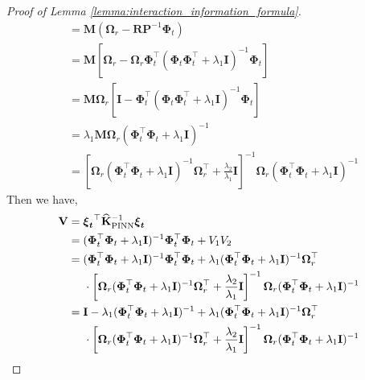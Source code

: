 \begin{proof}[Proof of Lemma \ref{lemma:interaction_information_formula}]
\begin{align}
            & = \mathbf{M}(\boldsymbol{\Omega}_r - \mathbf{R}\mathbf{P}^{-1}\boldsymbol{\Phi}_t)\\
            & = \mathbf{M}\left[\boldsymbol{\Omega}_r - \boldsymbol{\Omega}_r \boldsymbol{\Phi}_t^\top (\boldsymbol{\Phi}_t \boldsymbol{\Phi}_t^\top + \lambda_1\mathbf{I})^{-1}\boldsymbol{\Phi}_t\right] \\
            & = \mathbf{M}\boldsymbol{\Omega}_r \left[ \mathbf{I} - \boldsymbol{\Phi}_t^\top (\boldsymbol{\Phi}_t \boldsymbol{\Phi}_t^\top + \lambda_1\mathbf{I})^{-1}\boldsymbol{\Phi}_t\right]\\
            & = \lambda_1 \mathbf{M} \boldsymbol{\Omega}_r (\boldsymbol{\Phi}_t^\top \boldsymbol{\Phi}_t + \lambda_1\mathbf{I})^{-1} \\ 
            & = \left[\boldsymbol{\Omega}_r(\boldsymbol{\Phi}_t^\top \boldsymbol{\Phi}_t+ \lambda_1\mathbf{I})^{-1}\boldsymbol{\Omega}_r^\top + \frac{\lambda_2} {\lambda_1} \mathbf{I}\right]^{-1} \boldsymbol{\Omega}_r (\boldsymbol{\Phi}_t^\top \boldsymbol{\Phi}_t + \lambda_1\mathbf{I})^{-1}
    \end{align}
    Then we have, 
    \begin{align}
            \mathbf{V} &= \boldsymbol{\boldsymbol{\xi}_t}^\top \mathbf{\widehat{K}}_\mathrm{PINN}^{-1} \boldsymbol{\boldsymbol{\xi}_t}  
            \\
            & = (\boldsymbol{\Phi}_t^\top\boldsymbol{\Phi}_t+\lambda_1 \mathbf{I})^{-1} \boldsymbol{\Phi}_t^\top\boldsymbol{\Phi}_t + V_1V_2
            \\
            & = (\boldsymbol{\Phi}_t^\top\boldsymbol{\Phi}_t+\lambda_1 \mathbf{I})^{-1} \boldsymbol{\Phi}_t^\top\boldsymbol{\Phi}_t + \lambda_1(\boldsymbol{\Phi}_t^\top\boldsymbol{\Phi}_t + \lambda_1\mathbf{I})^{-1} \boldsymbol{\Omega}_r^\top \notag \\
            &  \;\;\;\;\; \cdot \left[\boldsymbol{\Omega}_r(\boldsymbol{\Phi}_t^\top \boldsymbol{\Phi}_t+ \lambda_1\mathbf{I})^{-1}\boldsymbol{\Omega}_r^\top + \frac{\lambda_2} {\lambda_1} \mathbf{I}\right]^{-1} \boldsymbol{\Omega}_r (\boldsymbol{\Phi}_t^\top \boldsymbol{\Phi}_t + \lambda_1\mathbf{I})^{-1} 
            \\
            &= \mathbf{I} - \lambda_1(\boldsymbol{\Phi}_t^\top\boldsymbol{\Phi}_t+\lambda_1 \mathbf{I})^{-1} + \lambda_1(\boldsymbol{\Phi}_t^\top\boldsymbol{\Phi}_t + \lambda_1\mathbf{I})^{-1} \boldsymbol{\Omega}_r^\top \notag \\
            & \;\;\;\;\;   \cdot \left[\boldsymbol{\Omega}_r(\boldsymbol{\Phi}_t^\top \boldsymbol{\Phi}_t+ \lambda_1\mathbf{I})^{-1}\boldsymbol{\Omega}_r^\top + \frac{\lambda_2} {\lambda_1} \mathbf{I}\right]^{-1} \boldsymbol{\Omega}_r (\boldsymbol{\Phi}_t^\top \boldsymbol{\Phi}_t + \lambda_1\mathbf{I})^{-1} 

\end{align}
\end{proof}
